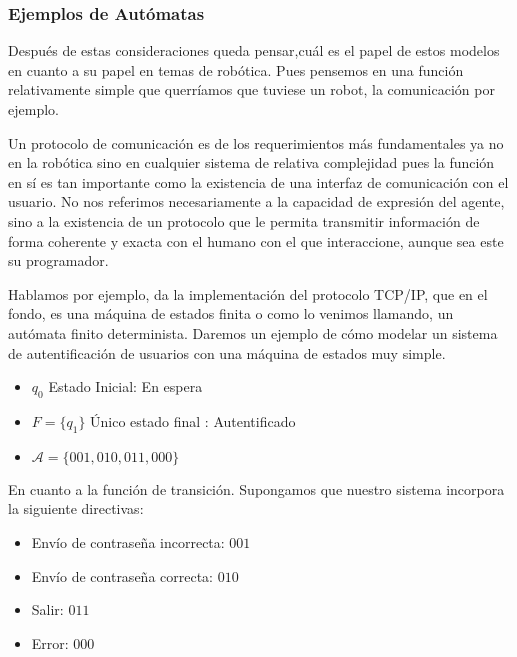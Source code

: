 \subsubsection{Ejemplos de Autómatas}

Después de estas consideraciones queda pensar,cuál es el papel de estos modelos en cuanto a su papel en temas de robótica. Pues pensemos en una función relativamente simple que querríamos que tuviese un robot, la comunicación por ejemplo.

Un protocolo de comunicación es de los requerimientos más fundamentales ya no en la robótica sino en cualquier sistema de relativa complejidad pues la función en sí es tan importante como la existencia de una interfaz de comunicación con el usuario. No nos referimos necesariamente a la capacidad de expresión del agente, sino a la existencia de un protocolo que le permita transmitir información de forma coherente y exacta con el humano con el que interaccione, aunque sea este su programador.

Hablamos por ejemplo, da la implementación del protocolo TCP/IP, que en el fondo, es una máquina de estados finita o como lo venimos llamando, un autómata finito determinista. Daremos un ejemplo de cómo modelar un sistema de autentificación de usuarios con una máquina de estados muy simple.

\begin{itemize}
	\item $q_0$ Estado Inicial: En espera
	\item $F=\{q_1\}$ Único estado final : Autentificado
	\item $\mathcal{A}=\{001,010,011,000\}$
\end{itemize}

En cuanto a la función de transición. Supongamos que nuestro sistema incorpora la siguiente directivas:

\begin{multicols}{2}
	\begin{itemize}
		\item Envío de contraseña incorrecta: $001$
		\item Envío de contraseña correcta: $010$
		\item Salir: $011$
		\item Error: $000$
	\end{itemize}
\end{multicols}

\vspace{1cm}

